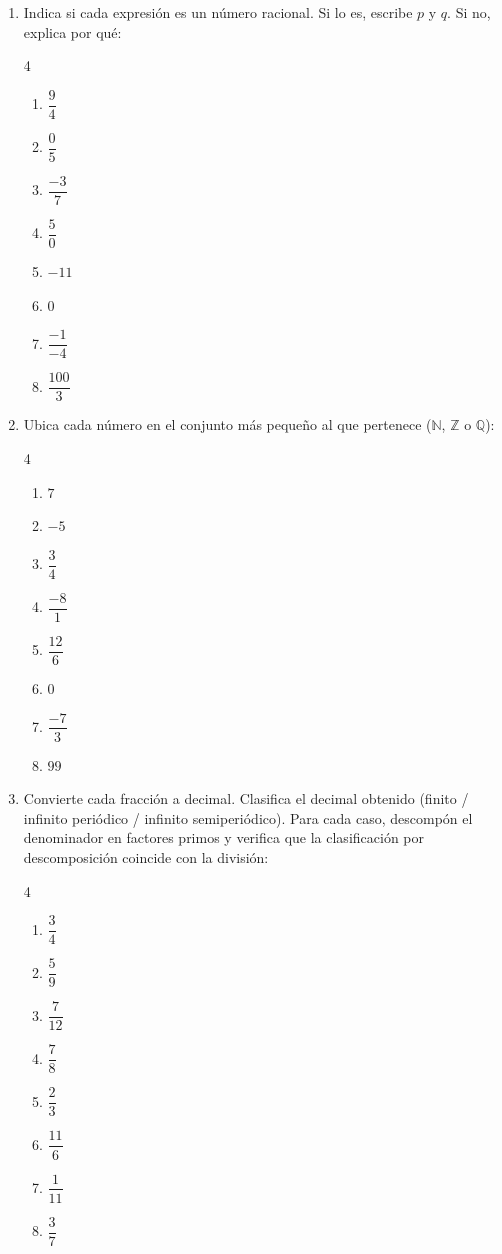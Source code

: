 \documentclass[11pt, letterpaper]{article}
\begin{document}
\begin{enumerate}[label=\textbf{\arabic*.}, leftmargin=*]

\item Indica si cada expresi\'on es un n\'umero racional. Si lo es, escribe $p$ y $q$. Si no, explica por qu\'e:
\begin{multicols}{4}
\begin{enumerate}[label=\alph*)]
  \item $\dfrac{9}{4}$ \item $\dfrac{0}{5}$ \item $\dfrac{-3}{7}$ \item $\dfrac{5}{0}$
  \item $-11$ \item $0$ \item $\dfrac{-1}{-4}$ \item $\dfrac{100}{3}$
\end{enumerate}
\end{multicols}

\item Ubica cada n\'umero en el conjunto m\'as peque\~no al que pertenece ($\mathbb{N}$, $\mathbb{Z}$ o $\mathbb{Q}$):
\begin{multicols}{4}
\begin{enumerate}[label=\alph*)]
  \item $7$ \item $-5$ \item $\dfrac{3}{4}$ \item $\dfrac{-8}{1}$
  \item $\dfrac{12}{6}$ \item $0$ \item $\dfrac{-7}{3}$ \item $99$
\end{enumerate}
\end{multicols}

\item Convierte cada fracci\'on a decimal. Clasifica el decimal obtenido (finito / infinito peri\'odico / infinito semiperi\'odico). Para cada caso, descompón el denominador en factores primos y verifica que la clasificaci\'on por descomposici\'on coincide con la divisi\'on:
\begin{multicols}{4}
\begin{enumerate}[label=\alph*)]
  \item $\dfrac{3}{4}$ \item $\dfrac{5}{9}$ \item $\dfrac{7}{12}$ \item $\dfrac{7}{8}$
  \item $\dfrac{2}{3}$ \item $\dfrac{11}{6}$ \item $\dfrac{1}{11}$ \item $\dfrac{3}{7}$
\end{enumerate}
\end{multicols}

\end{enumerate}
\end{document}

